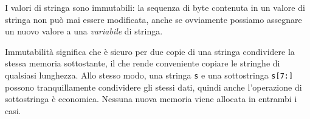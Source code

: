\documentclass[../../thesis.tex]{subfiles}
\begin{document}
    I valori di stringa sono immutabili: la sequenza di byte contenuta in un valore di stringa non può mai essere modificata, anche se ovviamente possiamo assegnare un nuovo valore a una \textit{variabile} di stringa.
    \hfill \vspace{12pt}

    Immutabilità significa che è sicuro per due copie di una stringa condividere la stessa memoria sottostante, il che rende conveniente copiare le stringhe di qualsiasi lunghezza.
    Allo stesso modo, una stringa \verb"s" e una sottostringa \verb"s[7:]" possono tranquillamente condividere gli stessi dati, quindi anche l'operazione di sottostringa è economica.
    Nessuna nuova memoria viene allocata in entrambi i casi.
    
    
    
    
\end{document}
